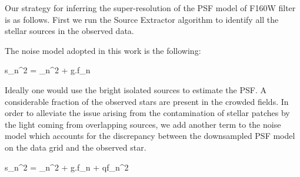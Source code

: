 Our strategy for inferring the super-resolution of the PSF model of F160W filter is as follows. First we run the Source Extractor algorithm to identify all the stellar sources in the observed data. 


The noise model adopted in this work is the following:

\beq
s_n^2 = \sigma_{n}^{2} + g.f_{n}
\eeq    

Ideally one would use the bright isolated sources to estimate the PSF. A considerable fraction of the observed stars are present in the crowded fields. 
In order to alleviate the issue arising from the contamination of stellar patches by the light coming from overlapping sources, we add another term to the noise model which accounts for the discrepancy between the downsampled PSF model on the data grid and the observed star. 

\beq
s_n^2 = \sigma_{n}^{2} + g.f_{n} + qf_{n}^{2}
\eeq 

